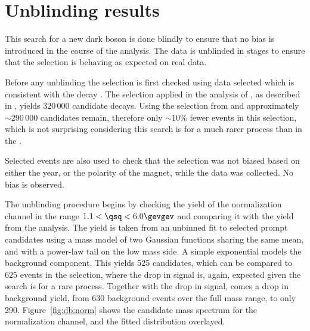 \section{Unblinding results}

This search for a new dark boson is done blindly to ensure that no bias is introduced in the
course of the analysis.
The data is unblinded in stages to ensure that the selection is behaving as expected on real data.

Before any unblinding the selection is first checked using data selected which is
consistent with the decay \decay{\Bd}{\jpsi\Kstarz}.
The selection applied in the \sm analysis of \btokstrmumu, as described in
, yields $320\,000$ candidate decays.
Using the selection from  and approximately $\sim290\,000$
\decay{\Bd}{\jpsi\Kstarz} candidates remain,
therefore only $\sim10\%$ fewer events in this selection, which is not surprising
considering this search is for a much rarer process than \decay{\Bd}{\Kstarz\mumu} in the \sm.

Selected \decay{\Bd}{\jpsi\Kstarz} events are also used to check that the selection was not biased
based on either the year, or the polarity of the \lhcb magnet, while the data was collected.
No bias is observed.


The unblinding procedure begins by checking the yield of the normalization channel
\btokstrmumu in the range $1.1<\qsq<6.0\gevgev$ and comparing it with the yield from the \sm
analysis.
The yield is taken from an unbinned fit to selected prompt \btokstrdb candidates using a mass model
of
two Gaussian functions sharing the same mean, and with a power-law tail on the low mass side.
A simple exponential models the background component.
This yields 525 \Bd candidates, which can be compared to \approx$625$ events in the \sm selection,
where the drop in signal is, again, expected given the search is for a rare process.
Together with the drop in signal, comes a drop in background yield, from \approx$630$ background
events over the full mass range, to only 290.
Figure~\ref{fig:db:norm} shows the \Bd candidate mass spectrum for the normalization channel, and
the fitted distribution overlayed.

